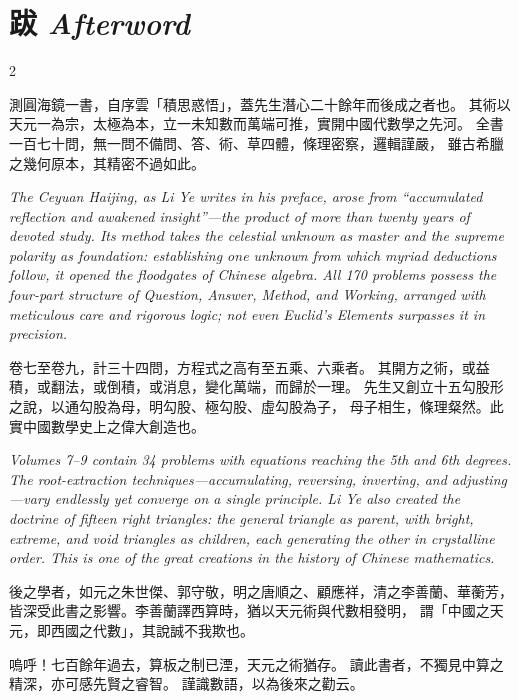 \documentclass[11pt,a4paper]{article}
\newcommand{\bilingsec}[2]{%
  \section{\tradfont #1 \hfill\normalfont\normalsize\textit{#2}}%
}
\newcommand{\cnpar}[1]{{\tradfont #1\par}}
\newcommand{\enpar}[1]{{\itshape #1\par}}
\begin{document}
\vspace{0.5cm}

\newpage
\bilingsec{跋}{Afterword}

\begin{paracol}{2}

\cnpar{%
測圓海鏡一書，自序雲「積思惑悟」，蓋先生潛心二十餘年而後成之者也。
其術以天元一為宗，太極為本，立一未知數而萬端可推，實開中國代數學之先河。
全書一百七十問，無一問不備問、答、術、草四體，條理密察，邏輯謹嚴，
雖古希臘之幾何原本，其精密不過如此。}

\switchcolumn

\enpar{%
The \textit{Ceyuan Haijing}, as Li Ye writes in his preface, arose from ``accumulated reflection and awakened insight''---the product of more than twenty years of devoted study. Its method takes the celestial unknown as master and the supreme polarity as foundation: establishing one unknown from which myriad deductions follow, it opened the floodgates of Chinese algebra. All 170 problems possess the four-part structure of Question, Answer, Method, and Working, arranged with meticulous care and rigorous logic; not even Euclid's \textit{Elements} surpasses it in precision.}

\switchcolumn*

\cnpar{%
卷七至卷九，計三十四問，方程式之高有至五乘、六乘者。
其開方之術，或益積，或翻法，或倒積，或消息，變化萬端，而歸於一理。
先生又創立十五勾股形之說，以通勾股為母，明勾股、極勾股、虛勾股為子，
母子相生，條理粲然。此實中國數學史上之偉大創造也。}

\switchcolumn

\enpar{%
Volumes 7--9 contain 34 problems with equations reaching the 5th and 6th degrees. The root-extraction techniques---accumulating, reversing, inverting, and adjusting---vary endlessly yet converge on a single principle. Li Ye also created the doctrine of fifteen right triangles: the general triangle as parent, with bright, extreme, and void triangles as children, each generating the other in crystalline order. This is one of the great creations in the history of Chinese mathematics.}

\switchcolumn*

\cnpar{%
後之學者，如元之朱世傑、郭守敬，明之唐順之、顧應祥，清之李善蘭、華蘅芳，
皆深受此書之影響。李善蘭譯西算時，猶以天元術與代數相發明，
謂「中國之天元，即西國之代數」，其說誠不我欺也。

嗚呼！七百餘年過去，算板之制已湮，天元之術猶存。
讀此書者，不獨見中算之精深，亦可感先賢之睿智。
謹識數語，以為後來之勸云。}


\end{paracol}
\end{document}
